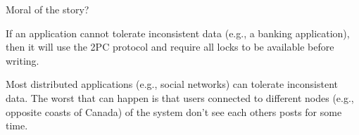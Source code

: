 %
%

\begin{frame}{Moral of the story?}

If an application cannot tolerate inconsistent data (e.g., a banking application), then it will use the 2PC protocol and require all locks to be available before writing.

Most distributed applications (e.g., social networks) can tolerate inconsistent data. The worst that can happen is that users connected to different nodes (e.g., opposite coasts of Canada) of the system don't see each others posts for some time.

\end{frame}








